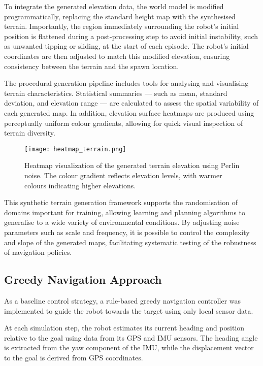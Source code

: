 \documentclass[conference]{IEEEtran}
\begin{document}
To integrate the generated elevation data, the world model is modified programmatically, replacing the standard height map with the synthesised terrain. Importantly, the region immediately surrounding the robot's initial position is flattened during a post-processing step to avoid initial instability, such as unwanted tipping or sliding, at the start of each episode. The robot's initial coordinates are then adjusted to match this modified elevation, ensuring consistency between the terrain and the spawn location.

The procedural generation pipeline includes tools for analysing and visualising terrain characteristics. Statistical summaries — such as mean, standard deviation, and elevation range — are calculated to assess the spatial variability of each generated map. In addition, elevation surface heatmaps are produced using perceptually uniform colour gradients, allowing for quick visual inspection of terrain diversity.

\begin{figure}[htbp]
    \centering
    \texttt{[image: heatmap\_terrain.png]}
    \caption{Heatmap visualization of the generated terrain elevation using Perlin noise. The colour gradient reflects elevation levels, with warmer colours indicating higher elevations.}
    \label{fig:heatmap_terrain}
\end{figure}

This synthetic terrain generation framework supports the randomisation of domains important for training, allowing learning and planning algorithms to generalise to a wide variety of environmental conditions. By adjusting noise parameters such as scale and frequency, it is possible to control the complexity and slope of the generated maps, facilitating systematic testing of the robustness of navigation policies.

\subsection{Greedy Navigation Approach}

As a baseline control strategy, a rule-based greedy navigation controller was implemented to guide the robot towards the target using only local sensor data.

At each simulation step, the robot estimates its current heading and position relative to the goal using data from its GPS and IMU sensors. The heading angle is extracted from the yaw component of the IMU, while the displacement vector to the goal is derived from GPS coordinates.
\end{document}

